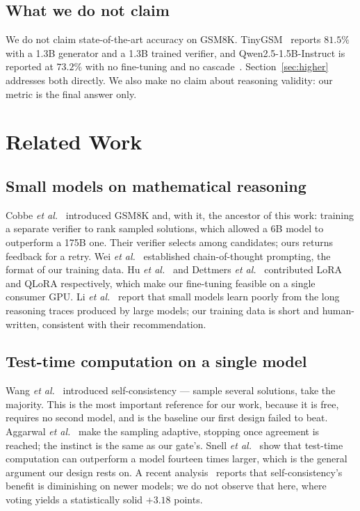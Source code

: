 \documentclass[conference]{IEEEtran}
\begin{document}
\subsection{What we do not claim}

We do not claim state-of-the-art accuracy on GSM8K. TinyGSM~\cite{liu2023tinygsm} reports
$81.5\%$ with a 1.3B generator and a 1.3B trained verifier, and Qwen2.5-1.5B-Instruct is
reported at $73.2\%$ with no fine-tuning and no cascade~\cite{qwen2024qwen25}.
Section~\ref{sec:higher} addresses both directly. We also make no claim about reasoning
validity: our metric is the final answer only.

\section{Related Work}

\subsection{Small models on mathematical reasoning}

Cobbe \textit{et al.}~\cite{cobbe2021gsm8k} introduced GSM8K and, with it, the ancestor of
this work: training a separate verifier to rank sampled solutions, which allowed a 6B
model to outperform a 175B one. Their verifier selects among candidates; ours returns
feedback for a retry. Wei \textit{et al.}~\cite{wei2022cot} established chain-of-thought
prompting, the format of our training data. Hu \textit{et al.}~\cite{hu2022lora} and
Dettmers \textit{et al.}~\cite{dettmers2023qlora} contributed LoRA and QLoRA
respectively, which make our fine-tuning feasible on a single consumer GPU. Li
\textit{et al.}~\cite{li2025smallmodels} report that small models learn poorly from the
long reasoning traces produced by large models; our training data is short and
human-written, consistent with their recommendation.

\subsection{Test-time computation on a single model}

Wang \textit{et al.}~\cite{wang2023selfconsistency} introduced self-consistency --- sample
several solutions, take the majority. This is the most important reference for our work,
because it is free, requires no second model, and is the baseline our first design failed
to beat. Aggarwal \textit{et al.}~\cite{aggarwal2023adaptive} make the sampling adaptive,
stopping once agreement is reached; the instinct is the same as our gate's. Snell
\textit{et al.}~\cite{snell2024testtime} show that test-time computation can outperform a
model fourteen times larger, which is the general argument our design rests on. A recent
analysis~\cite{selfconsistency2025edge} reports that self-consistency's benefit is
diminishing on newer models; we do not observe that here, where voting yields a
statistically solid $+3.18$ points.
\end{document}
